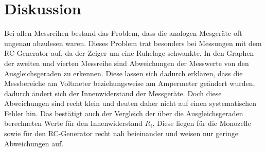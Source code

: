 \section{Diskussion}
Bei allen Messreihen bestand das Problem, dass die analogen Mesgeräte
oft ungenau abzulesen waren. Dieses Problem trat besonders bei Messungen mit
dem RC-Generator auf, da der Zeiger um eine Ruhelage schwankte.
In den Graphen der zweiten und vierten Messreihe sind Abweichungen der Messwerte von den
Ausgleichsgeraden zu erkennen. Diese lassen sich dadurch erklären, dass
die Messbereiche am Voltmeter beziehungsweise am Ampermeter geändert wurden,
dadurch ändert sich der Innenwiderstand der Messgeräte. Doch diese Abweichungen
sind recht klein und deuten daher nicht auf einen systematischen Fehler hin.
Das bestätigt auch der Vergleich der über die Ausgleichsgeraden berechneten
Werte für den Innenwiderstand $R_{i}$. Diese liegen für die Monozelle sowie für
den RC-Generator recht nah beieinander und weisen nur geringe Abweichungen auf.




\label{sec:Diskussion}
